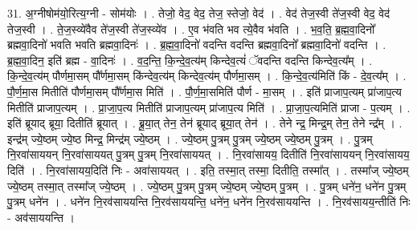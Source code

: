 \documentclass[17pt]{extarticle}
\begin{document}
31. अ॒ग्नीषोम॑यो॒रित्य॒ग्नी - सोम॑योः । . तेजो॒ वेद॒ वेद॒ तेज॒ स्तेजो॒ वेद॑ । . वेद॑ तेज॒स्वी ते॑ज॒स्वी वेद॒ वेद॑ तेज॒स्वी । . ते॒ज॒स्व्ये॑वैव ते॑ज॒स्वी ते॑ज॒स्व्ये॑व । . ए॒व भ॑वति भव त्ये॒वैव भ॑वति । . भ॒व॒ति॒ ब्र॒ह्म॒वा॒दिनो᳚ ब्रह्मवा॒दिनो॑ भवति भवति ब्रह्मवा॒दिनः॑ । . ब्र॒ह्म॒वा॒दिनो॑ वदन्ति वदन्ति ब्रह्मवा॒दिनो᳚ ब्रह्मवा॒दिनो॑ वदन्ति । . ब्र॒ह्म॒वा॒दिन॒ इति॑ ब्रह्म - वा॒दिनः॑ । . व॒द॒न्ति॒ कि॒न्दे॒व॒त्य॑म् किन्देव॒त्यं॑ ॅवदन्ति वदन्ति किन्देव॒त्य᳚म् । . कि॒न्दे॒व॒त्य॑म् पौर्णमा॒सम् पौ᳚र्णमा॒सम् कि॑न्देव॒त्य॑म् किन्देव॒त्य॑म् पौर्णमा॒सम् । . कि॒न्दे॒व॒त्य॑मिति॑ किं - दे॒व॒त्य᳚म् । . पौ॒र्ण॒मा॒स मितीति॑ पौर्णमा॒सम् पौ᳚र्णमा॒स मिति॑ । . पौ॒र्ण॒मा॒समिति॑ पौर्ण - मा॒सम् । . इति॑ प्राजाप॒त्यम् प्रा॑जाप॒त्य मितीति॑ प्राजाप॒त्यम् । . प्रा॒जा॒प॒त्य मितीति॑ प्राजाप॒त्यम् प्रा॑जाप॒त्य मिति॑ । . प्रा॒जा॒प॒त्यमिति॑ प्राजा - प॒त्यम् । . इति॑ ब्रूयाद् ब्रूया॒ दितीति॑ ब्रूयात् । . ब्रू॒या॒त् तेन॒ तेन॑ ब्रूयाद् ब्रूया॒त् तेन॑ । . तेने न्द्र॒ मिन्द्र॒म् तेन॒ तेने न्द्र᳚म् । . इन्द्र॑म् ज्ये॒ष्ठम् ज्ये॒ष्ठ मिन्द्र॒ मिन्द्र॑म् ज्ये॒ष्ठम् । . ज्ये॒ष्ठम् पु॒त्रम् पु॒त्रम् ज्ये॒ष्ठम् ज्ये॒ष्ठम् पु॒त्रम् । . पु॒त्रम् नि॒रवा॑साययन् नि॒रवा॑साययत् पु॒त्रम् पु॒त्रम् नि॒रवा॑साययत् । . नि॒रवा॑सायय॒ दितीति॑ नि॒रवा॑साययन् नि॒रवा॑सायय॒ दिति॑ । . नि॒रवा॑सायय॒दिति॑ निः - अवा॑साययत् । . इति॒ तस्मा॒त् तस्मा॒ दितीति॒ तस्मा᳚त् । . तस्मा᳚ज् ज्ये॒ष्ठम् ज्ये॒ष्ठम् तस्मा॒त् तस्मा᳚ज् ज्ये॒ष्ठम् । . ज्ये॒ष्ठम् पु॒त्रम् पु॒त्रम् ज्ये॒ष्ठम् ज्ये॒ष्ठम् पु॒त्रम् । . पु॒त्रम् धने॑न॒ धने॑न पु॒त्रम् पु॒त्रम् धने॑न । . धने॑न नि॒रव॑साययन्ति नि॒रव॑साययन्ति॒ धने॑न॒ धने॑न नि॒रव॑साययन्ति । . नि॒रव॑सायय॒न्तीति॑ निः - अव॑साययन्ति । \newline
\end{document}
